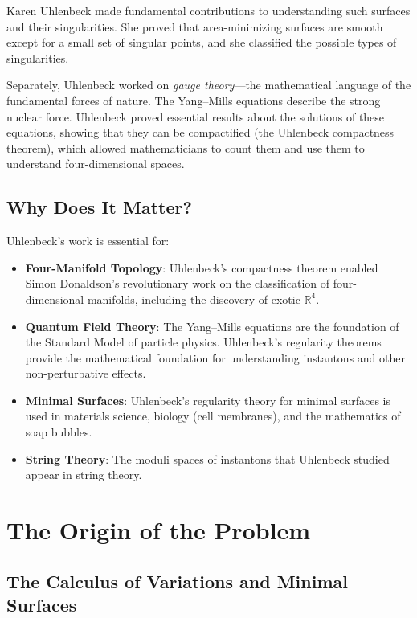 Karen Uhlenbeck made fundamental contributions to understanding such surfaces and their singularities. She proved that area-minimizing surfaces are smooth except for a small set of singular points, and she classified the possible types of singularities.

Separately, Uhlenbeck worked on \emph{gauge theory}---the mathematical language of the fundamental forces of nature. The Yang--Mills equations describe the strong nuclear force. Uhlenbeck proved essential results about the solutions of these equations, showing that they can be compactified (the Uhlenbeck compactness theorem), which allowed mathematicians to count them and use them to understand four-dimensional spaces.

\subsection{Why Does It Matter?}

Uhlenbeck's work is essential for:
\begin{itemize}
\item \textbf{Four-Manifold Topology}: Uhlenbeck's compactness theorem enabled Simon Donaldson's revolutionary work on the classification of four-dimensional manifolds, including the discovery of exotic $\mathbb{R}^4$.
\item \textbf{Quantum Field Theory}: The Yang--Mills equations are the foundation of the Standard Model of particle physics. Uhlenbeck's regularity theorems provide the mathematical foundation for understanding instantons and other non-perturbative effects.
\item \textbf{Minimal Surfaces}: Uhlenbeck's regularity theory for minimal surfaces is used in materials science, biology (cell membranes), and the mathematics of soap bubbles.
\item \textbf{String Theory}: The moduli spaces of instantons that Uhlenbeck studied appear in string theory.
\end{itemize}

\section{The Origin of the Problem}

\subsection{The Calculus of Variations and Minimal Surfaces}

